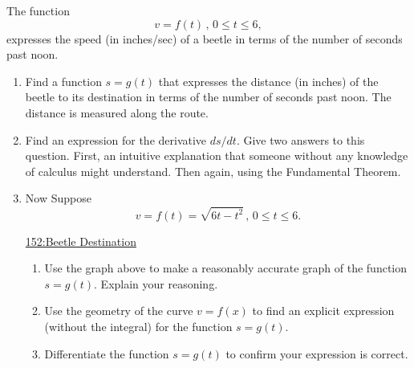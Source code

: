 \documentclass{ximera}
\begin{document}
\begin{question} \label{Q9r3r3DEDE}

The function
\[
 v =f(t) \, , \,  0\leq  t \leq 6,
\]
expresses the speed (in inches/sec) of a beetle in terms of the number of seconds past noon.

\begin{enumerate}
\item Find a function $s = g(t)$ that expresses the distance (in inches) of the beetle to its destination in terms of the number of seconds past noon. The distance is measured along the route.

\item Find an expression for the derivative $ds/dt$. Give two answers to this question. First, an intuitive explanation that someone without any knowledge of calculus might understand. Then again, using the Fundamental Theorem.



\item Now Suppose
\[
   v =f(t) = \sqrt{6t-t^2} \, , \, 0\leq t \leq 6.
\]

\begin{onlineOnly}
    \begin{center}
\end{center}
\end{onlineOnly}

\href{https://www.desmos.com/calculator/cr9oays9zo}{152:Beetle Destination}

\begin{enumerate}

\item Use the graph above to make a reasonably accurate graph of the function $s = g(t)$. Explain your reasoning.

\item Use the geometry of the curve $v = f(x)$ to find an explicit expression
 (without the integral) for the function $s = g(t)$.

\item Differentiate the function $s = g(t)$ to confirm your expression is correct.

\end{enumerate}
\end{enumerate}

\end{question}
\end{document}

